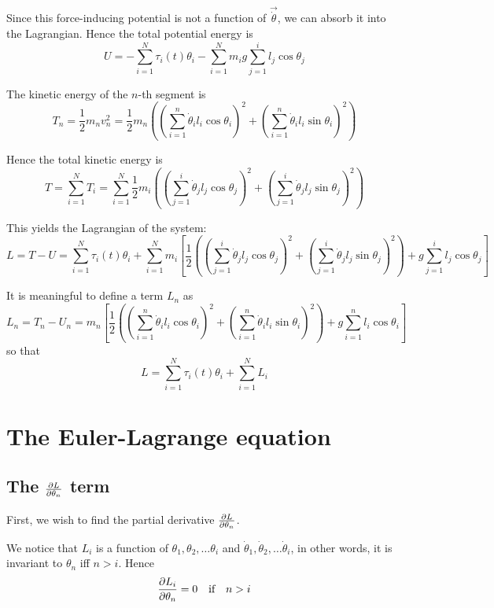 \documentclass[12pt]{article}
\begin{document}
	Since this force-inducing potential is not a function of $\vec{\dot{\theta}}$, we can absorb it into the Lagrangian. 	Hence the total potential energy is
	$$U=-\sum_{i=1}^N\tau_i(t)\theta_i-\sum_{i=1}^N m_ig\sum_{j=1}^i l_j \cos{\theta_j}$$
	
	The kinetic energy of the $n$-th segment is
	$$T_n=\frac{1}{2}m_nv_n^2=\frac{1}{2}m_n\left(\left(\sum_{i=1}^n \dot{\theta}_i l_i \cos{\theta_i}\right)^2+\left(\sum_{i=1}^n \dot{\theta}_i l_i \sin{\theta_i}\right)^2\right)$$
	
	Hence the total kinetic energy is
	$$T=\sum_{i=1}^N T_i = \sum_{i=1}^N \frac{1}{2}m_i\left(\left(\sum_{j=1}^i \dot{\theta}_j l_j \cos{\theta_j}\right)^2+\left(\sum_{j=1}^i \dot{\theta}_j l_j \sin{\theta_j}\right)^2\right)$$
	
	This yields the Lagrangian of the system:
	$$L=T-U=\sum_{i=1}^N\tau_i(t)\theta_i+\sum_{i=1}^N m_i \left[\frac{1}{2}\left(\left(\sum_{j=1}^i \dot{\theta}_j l_j \cos{\theta_j}\right)^2+\left(\sum_{j=1}^i \dot{\theta}_j l_j \sin{\theta_j}\right)^2\right)+g\sum_{j=1}^i l_j \cos{\theta_j}\right]$$
	
	It is meaningful to define a term $L_n$ as
	$$L_n=T_n-U_n = m_n\left[\frac{1}{2}\left(\left(\sum_{i=1}^n \dot{\theta}_i l_i \cos{\theta_i}\right)^2+\left(\sum_{i=1}^n \dot{\theta}_i l_i \sin{\theta_i}\right)^2\right)+g\sum_{i=1}^n l_i \cos{\theta_i}\right]$$
	so that
	$$L=\sum_{i=1}^N\tau_i(t)\theta_i+\sum_{i=1}^NL_i$$
	
	\section{The Euler-Lagrange equation}
	
	\subsection{The $\pdv{L}{\theta_n}$ term}
	First, we wish to find the partial derivative $\pdv{L}{\theta_n}$.
	
	We notice that $L_i$ is a function of $\theta_1,\theta_2,\dots \theta_i$ and $\dot{\theta}_1,\dot{\theta}_2,\dots \dot{\theta}_i$, in other words, it is invariant to $\theta_n$ iff $n>i$. Hence
	$$\pdv{L_i}{\theta_n}=0\qq{if}n>i$$
	
\end{document}
